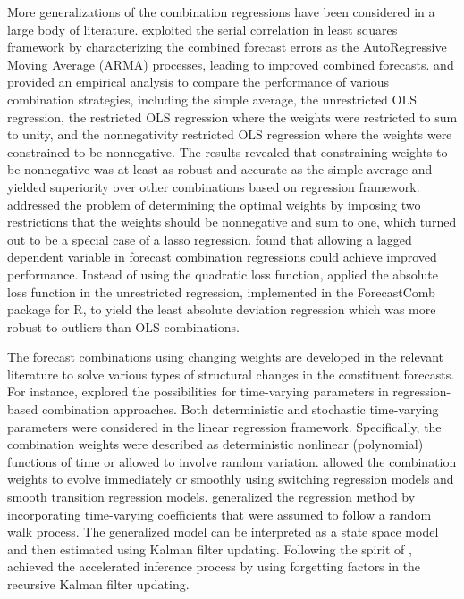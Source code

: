 \documentclass[11pt]{article}
\newcommand{\pkg}[1]{{\normalfont\fontseries{b}\selectfont #1}}
\let\proglang=\textsf
\begin{document}
More generalizations of the combination regressions have been considered in a large body of literature. \cite{Diebold1988-sx} exploited the serial correlation in least squares framework by characterizing the combined forecast errors as the AutoRegressive Moving Average (ARMA) processes, leading to improved combined forecasts. \cite{Gunter1992-go} and \cite{Aksu1992-lb} provided an empirical analysis to compare the performance of various combination strategies, including the simple average, the unrestricted OLS regression, the restricted OLS regression where the weights were restricted to sum to unity, and the nonnegativity restricted OLS regression where the weights were constrained to be nonnegative. The results revealed that constraining weights to be nonnegative was at least as robust and accurate as the simple average and yielded superiority over other combinations based on regression framework. \cite{Conflitti2015-fq} addressed the problem of determining the optimal weights by imposing two restrictions that the weights should be nonnegative and sum to one, which turned out to be a special case of a lasso regression. \cite{Edward_Coulson1993-db} found that allowing a lagged dependent variable in forecast combination regressions could achieve improved performance. Instead of using the quadratic loss function, \cite{Nowotarski2014-ev} applied the absolute loss function in the unrestricted regression, implemented in the \pkg{ForecastComb} package for \proglang{R}, to yield the least absolute deviation regression which was more robust to outliers than OLS combinations.

The forecast combinations using changing weights are developed in the relevant literature to solve various types of structural changes in the constituent forecasts. For instance, \cite{Diebold1987-go} explored the possibilities for time-varying parameters in regression-based combination approaches. Both deterministic and stochastic time-varying parameters were considered in the linear regression framework. Specifically, the combination weights were described as deterministic nonlinear (polynomial) functions of time or allowed to involve random variation. \cite{Deutsch1994-ob} allowed the combination weights to evolve immediately or smoothly using switching regression models and smooth transition regression models. \cite{Terui2002-df} generalized the regression method by incorporating time-varying coefficients that were assumed to follow a random walk process. The generalized model can be interpreted as a state space model and then estimated using Kalman filter updating. Following the spirit of \cite{Terui2002-df}, \cite{Raftery2010-qe} achieved the accelerated inference process by using forgetting factors in the recursive Kalman filter updating.
\end{document}
